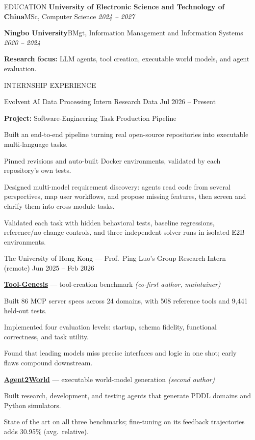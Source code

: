 \documentclass{kyvernitis-resume}
\newcommand{\eduentry}[3]{%
  \textbf{#1}\quad #2 \hfill \textit{#3}\par\smallskip}
\newcommand{\lead}[1]{\item[]\hspace{-2em}#1}
\begin{document}
\resumeheader
{}
{}
{}
{}
{}
{}

\begin{section}{EDUCATION}
  \eduentry{University of Electronic Science and Technology of China}{MSc, Computer Science}{2024 -- 2027}
  \eduentry{Ningbo University}{BMgt, Information Management and Information Systems}{2020 -- 2024}
  \textbf{Research focus:} LLM agents, tool creation, executable world models, and agent evaluation.
\end{section}

\begin{section}{INTERNSHIP EXPERIENCE}
  \begin{subsection}
    {Evolvent AI}
    {Data Processing Intern \textbar{} Research Data}
    {Jul 2026 -- Present}
    {}
    \lead{\textbf{Project:} Software-Engineering Task Production Pipeline}
    \item Built an end-to-end pipeline turning real open-source repositories into executable multi-language tasks.
    \item Pinned revisions and auto-built Docker environments, validated by each repository's own tests.
    \item Designed multi-model requirement discovery: agents read code from several perspectives, map user workflows, and propose missing features, then screen and clarify them into cross-module tasks.
    \item Validated each task with hidden behavioral tests, baseline regressions, reference/no-change controls, and three independent solver runs in isolated E2B environments.
  \end{subsection}

  \begin{subsection}
    {The University of Hong Kong --- Prof.\ Ping Luo's Group}
    {Research Intern (remote)}
    {Jun 2025 -- Feb 2026}
    {}
    \lead{\textbf{\href{https://arxiv.org/abs/2603.05578}{Tool-Genesis}} --- tool-creation benchmark \textit{(co-first author, maintainer)}}
    \item Built 86 MCP server specs across 24 domains, with 508 reference tools and 9,441 held-out tests.
    \item Implemented four evaluation levels: startup, schema fidelity, functional correctness, and task utility.
    \item Found that leading models miss precise interfaces and logic in one shot; early flaws compound downstream.
    \lead{\textbf{\href{https://arxiv.org/abs/2512.22336}{Agent2World}} --- executable world-model generation \textit{(second author)}}
    \item Built research, development, and testing agents that generate PDDL domains and Python simulators.
    \item State of the art on all three benchmarks; fine-tuning on its feedback trajectories adds 30.95\% (avg.\ relative).
  \end{subsection}


\end{section}
\end{document}
